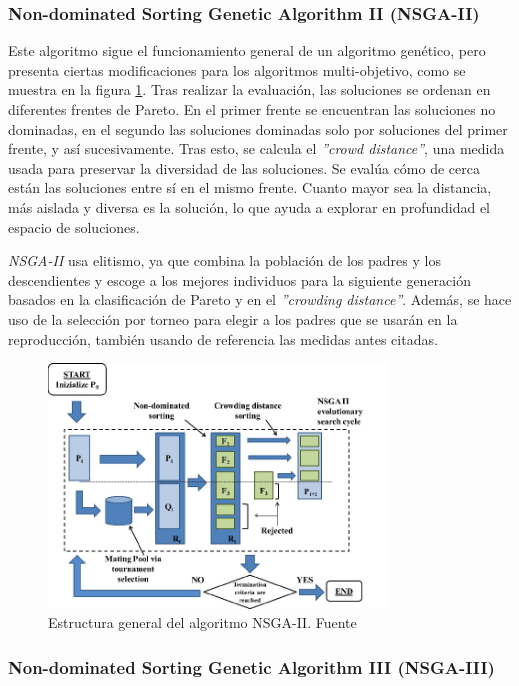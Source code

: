\subsubsection{Non-dominated Sorting Genetic Algorithm II (NSGA-II)}
\label{ch:nsga2}

Este algoritmo sigue el funcionamiento general de un algoritmo genético, pero presenta ciertas modificaciones para los algoritmos multi-objetivo, como se muestra en la figura \ref{fig:nsga2}. Tras realizar la evaluación, las soluciones se ordenan en diferentes frentes de Pareto. En el primer frente se encuentran las soluciones no dominadas, en el segundo las soluciones dominadas solo por soluciones del primer frente, y así sucesivamente. Tras esto, se calcula el \textit{''crowd distance''}, una medida usada para preservar la diversidad de las soluciones. Se evalúa cómo de cerca están las soluciones entre sí en el mismo frente. Cuanto mayor sea la distancia, más aislada y diversa es la solución, lo que ayuda a explorar en profundidad el espacio de soluciones.

\textit{NSGA-II} usa elitismo, ya que combina la población de los padres y los descendientes y escoge a los mejores individuos para la siguiente generación basados en la clasificación de Pareto y en el \textit{''crowding distance''}. Además, se hace uso de la selección por torneo para elegir a los padres que se usarán en la reproducción, también usando de referencia las medidas antes citadas.

\begin{figure}[H]
  \centering
  \includegraphics[width=0.8\textwidth]{figures/nsga2.png}
  \caption{Estructura general del algoritmo NSGA-II. Fuente \cite{nsga2_imagen}}
  \label{fig:nsga2}
\end{figure}

\subsubsection{Non-dominated Sorting Genetic Algorithm III (NSGA-III)}
\label{ch:nsga3}


